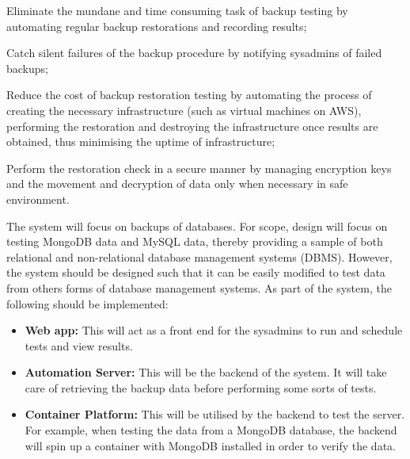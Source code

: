 \begin{AO}
	\item \label{ao1} Eliminate the mundane and time consuming task of backup testing by automating regular backup restorations and recording results;
	\item \label{ao2} Catch silent failures of the backup procedure by notifying sysadmins of failed backups;
	\item \label{ao3} Reduce the cost of backup restoration testing by automating the process of creating the necessary infrastructure (such as virtual machines on AWS), performing the restoration and destroying the infrastructure once results are obtained, thus minimising the uptime of infrastructure;
	\item \label{ao4} Perform the restoration check in a secure manner by managing encryption keys and the movement and decryption of data only when necessary in safe environment.
\end{AO}

The system will focus on backups of databases. For scope, design will focus on testing MongoDB data and MySQL data, thereby providing a sample of both relational and non-relational database management systems (DBMS). However, the system should be designed such that it can be easily modified to test data from others forms of database management systems. As part of the system, the following should be implemented:

\begin{itemize}
	\item \textbf{Web app:} This will act as a front end for the sysadmins to run and schedule tests and view results.
	\item \textbf{Automation Server:} This will be the backend of the system. It will take care of retrieving the backup data before performing some sorts of tests.
	\item \textbf{Container Platform:} This will be utilised by the backend to test the server. For example, when testing the data from a MongoDB database, the backend will spin up a container with MongoDB installed in order to verify the data. 
\end{itemize}